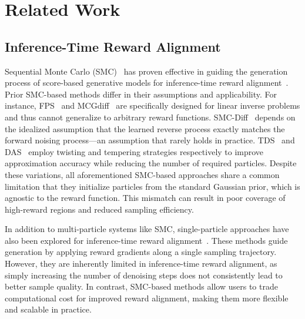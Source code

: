 \section{Related Work}
\label{sec:related works}
\subsection{Inference-Time Reward Alignment}
Sequential Monte Carlo (SMC)~\cite{doucet2001sequential, del2006sequential, chopin2020introduction} has proven effective in guiding the generation process of score-based generative models for inference-time reward alignment~\cite{cardoso2024mcgdiff, trippe2023smcdiff, dou2024fps, wu2023tds, kim2025DAS}. Prior SMC-based methods differ in their assumptions and applicability. For instance, FPS~\cite{dou2024fps} and MCGdiff~\cite{cardoso2024mcgdiff} are specifically designed for linear inverse problems and thus cannot generalize to arbitrary reward functions. SMC-Diff~\cite{trippe2023smcdiff} depends on the idealized assumption that the learned reverse process exactly matches the forward noising process—an assumption that rarely holds in practice. TDS~\cite{wu2023tds} and DAS~\cite{kim2025DAS} employ twisting and tempering strategies respectively to improve approximation accuracy while reducing the number of required particles. Despite these variations, all aforementioned SMC-based approaches share a common limitation that they initialize particles from the standard Gaussian prior, which is agnostic to the reward function. This mismatch can result in poor coverage of high-reward regions and reduced sampling efficiency.

In addition to multi-particle systems like SMC, single-particle approaches have also been explored for inference-time reward alignment~\cite{chung2023dps, yu2023freedom, bansal2024universal, ye2024tfg}. These methods guide generation by applying reward gradients along a single sampling trajectory. However, they are inherently limited in inference-time reward alignment, as simply increasing the number of denoising steps does not consistently lead to better sample quality. In contrast, SMC-based methods allow users to trade computational cost for improved reward alignment, making them more flexible and scalable in practice.

